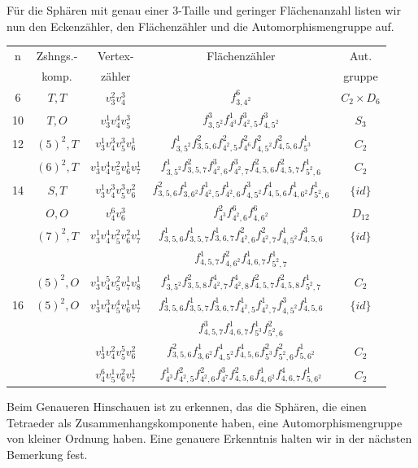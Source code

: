 \documentclass[12pt,titlepage,twoside,cleardoublepage]{article}
\theoremstyle{nummermitklammern}
\numberwithin{equation}{section}
\begin{document}
Für die Sphären mit genau einer 3-Taille und geringer Flächenanzahl listen wir nun den Eckenzähler, den Flächenzähler und die Automorphismengruppe auf.
\begin{center}
\begin{tabular}[h]{|c|c|c|c|c|}
\hline
n &Zshngs.-& Vertex- & Flächenzähler & Aut.\\
&komp.&zähler&& gruppe\\
 \hline
 6& $T,T$ & $v_3^2v_4^3$&$f^6_{3,4^2}$& $C_2\times D_6$\\
 \hline
10& $T,O$ & $v_3^1v_4^4v_5^3$& $f^3_{3,5^2}f^1_{4^3}f^3_{4^2,5}f^3_{4,5^2}$ &$S_3$\\
 \hline
12& $(5)^2,T$ &$v_3^1v_4^3v_5^3v_6^1$& $f^1_{3,5^2}f^2_{3,5,6}f^2_{4^2,5}f^2_{4^6}f^2_{4,5^2}f^2_{4,5,6}f^1_{5^3}$&$C_2$\\
 \hline
  & $(6)^2,T $& $ v_3^1v_4^4v_5^2v_6^1v_7^1$& $f^1_{3,5^2}f^2_{3,5,7}f^3_{4^2,6}f^3_{4^2,7}f^2_{4,5,6}f^2_{4,5,7}f^1_{5^2,6}$ &$C_2$\\
14& $S,T$& $ v_3^1v_4^3v_5^3v_6^2$& $f^2_{3,5,6}f^1_{3,6^2}f^1_{4^2,5}f^1_{4^2,6}f^3_{4,5^2}f^4_{4,5,6}f^1_{4,6^2}f^1_{5^2,6}$ &$\{id\}$\\
  & $O,O$ & $v_4^6v_6^3$& $f^2_{4^3}f^6_{4^2,6}f^6_{4,6^2} $ & $D_{12}$\\
 \hline
  &$(7)^2,T$ &$v_3^1v_4^4v_5^2v_6^2v_7^1$&$f^1_{3,5,6}f^1_{3,5,7}f^1_{3,6,7}f^2_{4^2,6}f^2_{4^2,7}f^1_{4,5^2}f^3_{4,5,6}$ &$\{id\}$ \\
  &&&$f^1_{4,5,7}f^2_{4,6^2}f^1_{4,6,7}f^1_{5^2,7}$&\\
  & $(5)^2,O$& $v_3^1v_4^5v_5^2v_7^1v_8^1$&$f^1_{3,5^2}f^2_{3,5,8}f^4_{4^2,7}f^4_{4^2,8}f^2_{4,5,7}f^2_{4,5,8}f^1_{5^2,7}$ &$C_2$\\
16& $(5)^2,O$&$ v_3^1v_4^3v_5^4v_6^1v_7^1$&$f^1_{3,5,6}f^1_{3,5,7}f^1_{3,6,7}f^1_{4^2,5}f^1_{4^2,7}f^3_{4,5^2}f^1_{4,5,6}$ &$\{id\}$\\
&&&$f^3_{4,5,7}f^1_{4,6,7}f^1_{5^3}f^2_{5^2,6}$&\\
  &          & $v_3^1v_4^2v_5^5v_6^2$& $f^2_{3,5,6}f^1_{3,6^2}f^4_{4,5^2}f^4_{4,5,6}f^2_{5^3}f^2_{5^2,6}f^1_{5,6^2}$ &$C_2$\\
  &          &$v_4^6v_5^1v_6^2v_7^1$ &$f^1_{4^3}f^2_{4^2,5}f^2_{4^2,6}f^3_{4^7}f^2_{4,5,6}f^1_{4,6^2}f^4_{4,6,7}f^1_{5,6^2}$ &$C_2$\\
 \hline
\end{tabular}
\end{center}
Beim Genaueren Hinschauen ist zu erkennen, das die Sphären, die einen Tetraeder als Zusammenhangskomponente haben, eine Automorphismengruppe von kleiner Ordnung haben. Eine genauere Erkenntnis halten wir in der nächsten Bemerkung fest.
\end{document}
